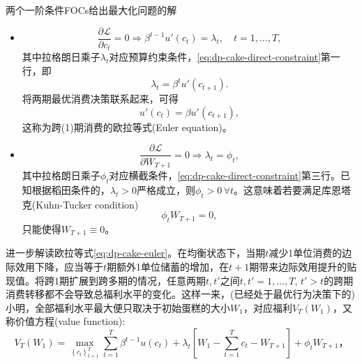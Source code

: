 两个一阶条件FOCs给出最大化问题的解
\begin{itemize}
  \item
  \begin{equation}
  \label{eq:dp-cake-foc-c}
  \frac{\partial \mathcal{L}}{\partial c_{t}} = 0 \Rightarrow \beta^{t-1} u' \left( c_{t} \right) = \lambda_{t}, \quad t = 1,\ldots, T,
\end{equation}
其中拉格朗日乘子$\lambda_{t}$对应预算约束条件，\eqref{eq:dp-cake-direct-constraint}第一行，即
\begin{equation*}
  \lambda_{t} = \beta^{t} u' \left( c_{t+1} \right).
\end{equation*}
将两期最优消费决策联系起来，可得
\begin{equation}
  \label{eq:dp-cake-euler}
  u'(c_{t}) = \beta u'(c_{t+1}),
\end{equation}
这称为跨(1)期消费的欧拉等式(Euler equation)。

\item
\begin{equation}
  \label{eq:dp-cake-foc-w}
  \frac{\partial \mathcal{L}}{\partial W_{T+1}} =0 \Rightarrow \lambda_{t} = \phi_{t},
\end{equation}
其中拉格朗日乘子$\phi_{t}$对应横截条件，\eqref{eq:dp-cake-direct-constraint}第三行。已知根据稻田条件的，$\lambda_{t} > 0$严格成立，则$\phi_{t} > 0 \, \forall t$。这意味着若要满足库恩塔克(Kuhn-Tucker condition)
\begin{equation}
  \label{eq:dp-cake-kuhn-tucker}
  \phi_{t} W_{T+1} =0,
\end{equation}
只能使得$W_{T+1} \equiv 0$。
\end{itemize}

进一步解读欧拉等式\eqref{eq:dp-cake-euler}。在均衡状态下，当期$t$减少1单位消费的边际效用下降，应当等于$t$期额外1单位储蓄的增加，在$t+1$期带来边际效用提升的贴现值。将跨1期扩展到跨多期的情况，任意两期$t,t'$之间$t,t'=1,\ldots,T, \, t' > t$的跨期消费转移都不会导致总福利水平的变化。这样一来，(已经处于最优行为决策下的)小明，全部福利水平最大便只取决于初始蛋糕的大小$W_{1}$，对应福利$V_{T} \left( W_{1} \right)$，又称价值方程(value function):
\begin{equation}
  \label{eq:dp-cake-value-function}
  V_{T} \left( W_{1} \right)
  = \max_{ \left\{ c_{t} \right\}_{t=1}^{T}}
  \sum_{t=1}^{T} \beta^{t-1} u \left( c_{t} \right)
  + \lambda_{t} \left[ W_{1} - \sum_{t=1}^{T} c_{t} - W_{T+1} \right] + \phi_{t} W_{T+1}，
\end{equation}

